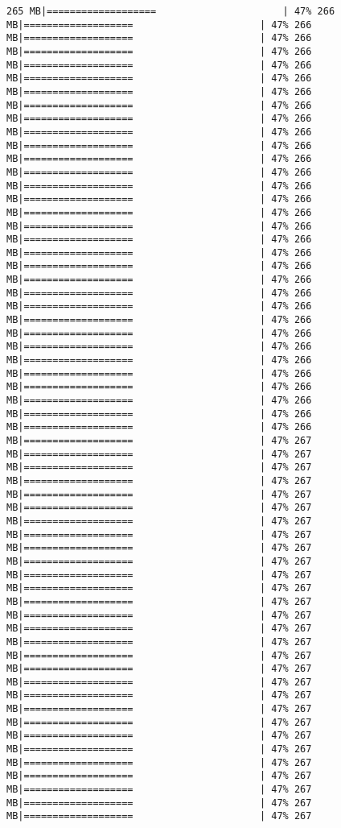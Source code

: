 \documentclass[
]{article}
\begin{document}
\begin{verbatim}
265 MB|===================                      | 47% 266 MB|===================                      | 47% 266 MB|===================                      | 47% 266 MB|===================                      | 47% 266 MB|===================                      | 47% 266 MB|===================                      | 47% 266 MB|===================                      | 47% 266 MB|===================                      | 47% 266 MB|===================                      | 47% 266 MB|===================                      | 47% 266 MB|===================                      | 47% 266 MB|===================                      | 47% 266 MB|===================                      | 47% 266 MB|===================                      | 47% 266 MB|===================                      | 47% 266 MB|===================                      | 47% 266 MB|===================                      | 47% 266 MB|===================                      | 47% 266 MB|===================                      | 47% 266 MB|===================                      | 47% 266 MB|===================                      | 47% 266 MB|===================                      | 47% 266 MB|===================                      | 47% 266 MB|===================                      | 47% 266 MB|===================                      | 47% 266 MB|===================                      | 47% 266 MB|===================                      | 47% 266 MB|===================                      | 47% 266 MB|===================                      | 47% 266 MB|===================                      | 47% 266 MB|===================                      | 47% 266 MB|===================                      | 47% 266 MB|===================                      | 47% 267 MB|===================                      | 47% 267 MB|===================                      | 47% 267 MB|===================                      | 47% 267 MB|===================                      | 47% 267 MB|===================                      | 47% 267 MB|===================                      | 47% 267 MB|===================                      | 47% 267 MB|===================                      | 47% 267 MB|===================                      | 47% 267 MB|===================                      | 47% 267 MB|===================                      | 47% 267 MB|===================                      | 47% 267 MB|===================                      | 47% 267 MB|===================                      | 47% 267 MB|===================                      | 47% 267 MB|===================                      | 47% 267 MB|===================                      | 47% 267 MB|===================                      | 47% 267 MB|===================                      | 47% 267 MB|===================                      | 47% 267 MB|===================                      | 47% 267 MB|===================                      | 47% 267 MB|===================                      | 47% 267 MB|===================                      | 47% 267 MB|===================                      | 47% 267 MB|===================                      | 47% 267 MB|===================                      | 47% 267 MB|===================                      | 47% 267 
\end{verbatim}
\end{document}
